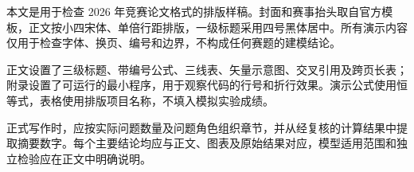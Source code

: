 本文是用于检查 2026 年竞赛论文格式的排版样稿。封面和赛事抬头取自官方模板，正文按小四宋体、单倍行距排版，一级标题采用四号黑体居中。所有演示内容仅用于检查字体、换页、编号和边界，不构成任何赛题的建模结论。

正文设置了三级标题、带编号公式、三线表、矢量示意图、交叉引用及跨页长表；附录设置了可运行的最小程序，用于观察代码的行号和折行效果。演示公式使用恒等式，表格使用排版项目名称，不填入模拟实验成绩。

正式写作时，应按实际问题数量及问题角色组织章节，并从经复核的计算结果中提取摘要数字。每个主要结论均应与正文、图表及原始结果对应，模型适用范围和独立检验应在正文中明确说明。

